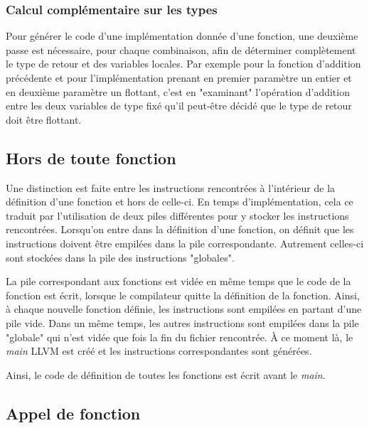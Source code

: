 \documentclass[12pt]{article}
\begin{document}
\subsubsection{Calcul complémentaire sur les types}

Pour générer le code d'une implémentation donnée d'une fonction, une deuxième passe est nécessaire, pour chaque combinaison, afin de déterminer complètement le type de retour et des variables locales. Par exemple pour la fonction d'addition précédente et pour l'implémentation prenant en premier paramètre un entier et en deuxième paramètre un flottant, c'est en "examinant" l'opération d'addition entre les deux variables de type fixé qu'il peut-être décidé que le type de retour doit être flottant.

\subsection{Hors de toute fonction}

Une distinction est faite entre les instructions rencontrées à l'intérieur de la définition d'une fonction et hors de celle-ci. En temps d'implémentation, cela ce traduit par l'utilisation de deux piles différentes pour y stocker les instructions rencontrées. Lorsqu'on entre dans la définition d'une fonction, on définit que les instructions doivent être empilées dans la pile correspondante. Autrement celles-ci sont stockées dans la pile des instructions "globales".

La pile correspondant aux fonctions est vidée en même temps que le code de la fonction est écrit, lorsque le compilateur quitte la définition de la fonction. Ainsi, à chaque nouvelle fonction définie, les instructions sont empilées en partant d'une pile vide. Dans un même temps, les autres instructions sont empilées dans la pile "globale" qui n'est vidée que fois la fin du fichier rencontrée.
À ce moment là, le \emph{main} LLVM est créé et les instructions correspondantes sont générées.

Ainsi, le code de définition de toutes les fonctions est écrit avant le \emph{main}.

\subsection{Appel de fonction}
\end{document}
